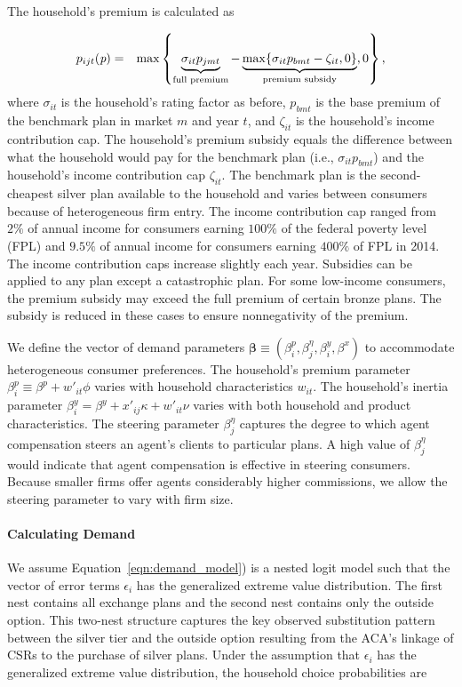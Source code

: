 \documentclass[12pt]{article}
\begin{document}
The household's premium is calculated as

\vspace{-0.4in}
\begin{eqnarray}
\label{eqn:cons_premium}
	p_{ijt}(\textit{p}) &=& \max \left \lbrace \underbrace{\sigma_{it} p_{jmt}}_{\text{\scriptsize{full premium}}}  - \underbrace{\max\{\sigma_{it} p_{bmt} - \zeta_{it},0\}}_{\text{\scriptsize{premium subsidy}}},0 \right \rbrace, 
\end{eqnarray}
where $\sigma_{it}$ is the household's rating factor as before, $p_{bmt}$ is the base premium of the benchmark plan in market $m$ and year $t$, and $\zeta_{it}$ is the household's income contribution cap.  The household's premium subsidy equals the difference between what the household would pay for the benchmark plan (i.e., $\sigma_{it} p_{bmt}$) and the household's income contribution cap $\zeta_{it}$. The benchmark plan is the second-cheapest silver plan available to the household and varies between consumers because of heterogeneous firm entry. The income contribution cap ranged from $2\%$ of annual income for consumers earning $100\%$ of the federal poverty level (FPL) and $9.5\%$ of annual income for consumers earning $400\%$ of FPL in 2014. The income contribution caps increase slightly each year. Subsidies can be applied to any plan except a catastrophic plan. For some low-income consumers, the premium subsidy may exceed the full premium of certain bronze plans. The subsidy is reduced in these cases to ensure nonnegativity of the premium. 

We define the vector of demand parameters $\boldsymbol{\beta} \equiv (\beta_i^p,\beta_j^{\eta},\beta_i^y,\beta^x)$ to accommodate heterogeneous consumer preferences.  The household's premium parameter $\beta_{i}^p \equiv \beta^p + w'_{it} \phi$ varies with household characteristics $w_{it}$.  The household's inertia parameter $\beta_i^y = \beta^y +  x'_{ij} \kappa + w'_{it} \nu$ varies with both household and product characteristics. The steering parameter $\beta_j^{\eta}$ captures the degree to which agent compensation steers  an agent's clients to particular plans.  A high value of $\beta_j^{\eta}$ would indicate that agent compensation is effective in steering consumers.   Because smaller firms offer agents considerably higher commissions, we allow the steering parameter to vary with firm size.


\paragraph{Calculating Demand}
We assume Equation~\eqref{eqn:demand_model}) is a nested logit model such that the vector of error terms $\epsilon_i$ has the generalized extreme value distribution.  The first nest contains all exchange plans and the second nest contains only the outside option.  This two-nest structure captures the key observed substitution pattern between the silver tier and the outside option resulting from the ACA's linkage of CSRs to the purchase of silver plans. Under the assumption that $\epsilon_i$ has the generalized extreme value distribution, the household choice probabilities are 
\end{document}
